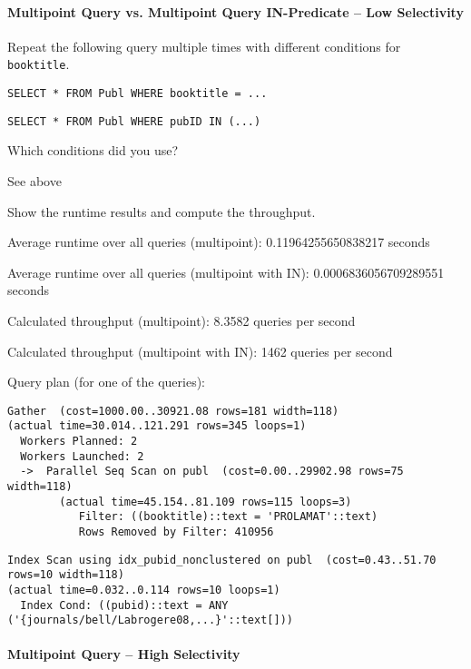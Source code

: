 \documentclass[11pt]{scrartcl}
\begin{document}
\paragraph{Multipoint Query vs. Multipoint Query IN-Predicate -- Low Selectivity}

Repeat the following query multiple times with different conditions for \texttt{booktitle}.

\begin{lstlisting}[style=dbtsql]
SELECT * FROM Publ WHERE booktitle = ...
\end{lstlisting}

\begin{lstlisting}[style=dbtsql]
SELECT * FROM Publ WHERE pubID IN (...)
\end{lstlisting}


Which conditions did you use?

See above

Show the runtime results and compute the throughput.

Average runtime over all queries (multipoint): 0.11964255650838217 seconds

Average runtime over all queries (multipoint with IN): 0.0006836056709289551 seconds

Calculated throughput (multipoint): 8.3582 queries per second

Calculated throughput (multipoint with IN): 1462 queries per second 

Query plan (for one of the queries):

{\small
\parskip0pt\begin{verbatim}
Gather  (cost=1000.00..30921.08 rows=181 width=118) 
(actual time=30.014..121.291 rows=345 loops=1)
  Workers Planned: 2
  Workers Launched: 2
  ->  Parallel Seq Scan on publ  (cost=0.00..29902.98 rows=75 width=118) 
        (actual time=45.154..81.109 rows=115 loops=3)
           Filter: ((booktitle)::text = 'PROLAMAT'::text)
           Rows Removed by Filter: 410956
\end{verbatim}}

{\small
\parskip0pt\begin{verbatim}
Index Scan using idx_pubid_nonclustered on publ  (cost=0.43..51.70 rows=10 width=118) 
(actual time=0.032..0.114 rows=10 loops=1)
  Index Cond: ((pubid)::text = ANY ('{journals/bell/Labrogere08,...}'::text[]))
\end{verbatim}}

\paragraph{Multipoint Query -- High Selectivity}
\end{document}
